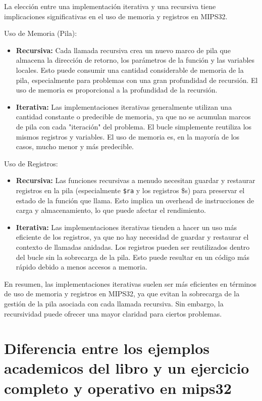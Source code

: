 \documentclass{article}
\begin{document}
La elección entre una implementación iterativa y una recursiva tiene implicaciones significativas en el uso de memoria y registros en MIPS32.

 Uso de Memoria (Pila):
\begin{itemize}
    \item \textbf{Recursiva:} Cada llamada recursiva crea un nuevo marco de pila que almacena la dirección de retorno, los parámetros de la función y las variables locales. Esto puede consumir una cantidad considerable de memoria de la pila, especialmente para problemas con una gran profundidad de recursión. El uso de memoria es proporcional a la profundidad de la recursión.
    \item \textbf{Iterativa:} Las implementaciones iterativas generalmente utilizan una cantidad constante o predecible de memoria, ya que no se acumulan marcos de pila con cada "iteración" del problema. El bucle simplemente reutiliza los mismos registros y variables. El uso de memoria es, en la mayoría de los casos, mucho menor y más predecible.
\end{itemize}

 Uso de Registros:
\begin{itemize}
    \item \textbf{Recursiva:} Las funciones recursivas a menudo necesitan guardar y restaurar registros en la pila (especialmente \texttt{\$ra} y los registros \$s) para preservar el estado de la función que llama. Esto implica un overhead de instrucciones de carga y almacenamiento, lo que puede afectar el rendimiento.
    \item \textbf{Iterativa:} Las implementaciones iterativas tienden a hacer un uso más eficiente de los registros, ya que no hay necesidad de guardar y restaurar el contexto de llamadas anidadas. Los registros pueden ser reutilizados dentro del bucle sin la sobrecarga de la pila. Esto puede resultar en un código más rápido debido a menos accesos a memoria.
\end{itemize}

En resumen, las implementaciones iterativas suelen ser más eficientes en términos de uso de memoria y registros en MIPS32, ya que evitan la sobrecarga de la gestión de la pila asociada con cada llamada recursiva. Sin embargo, la recursividad puede ofrecer una mayor claridad para ciertos problemas.

\section{Diferencia entre los ejemplos academicos del libro y un ejercicio completo y operativo en mips32}
\end{document}

